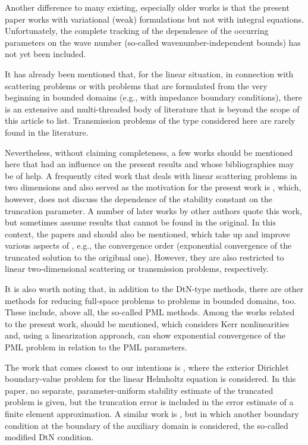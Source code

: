 \documentclass[12pt,DIV=14]{scrartcl}
\begin{document}
Another difference to many existing, especially older works is that the present paper works
with variational (weak) formulations but not with integral equations. Unfortunately,
the complete tracking of the dependence of the occurring parameters on the wave number
(so-called wavenumber-independent bounds) has not yet been included.

It has already been mentioned that, for the linear situation,
in connection with scattering problems or with problems that are formulated
from the very beginning in bounded domains (e.g., with impedance boundary conditions),
there is an extensive and multi-threaded body of literature that is beyond
the scope of this article to list.
Transmission problems of the type considered here are rarely found in the literature.

Nevertheless, without claiming completeness, a few works should be mentioned here that
had an influence on the present results and whose bibliographies may be of help.
A frequently cited work that deals with linear scattering problems in two dimensions
and also served as the motivation for the present work is \cite{Hsiao:11},
which, however, does not discuss the dependence of the stability constant on the truncation parameter.
A number of later works by other authors quote this work, but sometimes assume results
that cannot be found in the original.
In this context, the papers \cite{Li:20b} and \cite{Xu:21} should also be mentioned,
which take up and improve various aspects of \cite{Hsiao:11}, e.g.,
the convergence order (exponential convergence of the truncated solution to the origibnal one).
However, they are also restricted to linear two-dimensional scattering or transmission problems,
respectively.

It is also worth noting that, in addition to the DtN-type methods,
there are other methods for reducing full-space problems to problems in bounded domains, too.
These include, above all, the so-called PML methods. Among the works related to the present work,
\cite{Jiang:22} should be mentioned, which considers Kerr nonlinearities and,
using a linearization approach, can show exponential convergence of the PML problem
in relation to the PML parameters.

The work that comes closest to our intentions is \cite{Koyama:07},
where the exterior Dirichlet boundary-value problem for the linear Helmholtz equation
is considered.
In this paper, no separate, parameter-uniform stability estimate of the truncated problem
is given, but the truncation error is included in the error estimate
of a finite element approximation.
A similar work is \cite{Koyama:09}, but in which another boundary condition at the boundary
of the auxiliary domain is considered, the so-called modified DtN condition.
\end{document}
